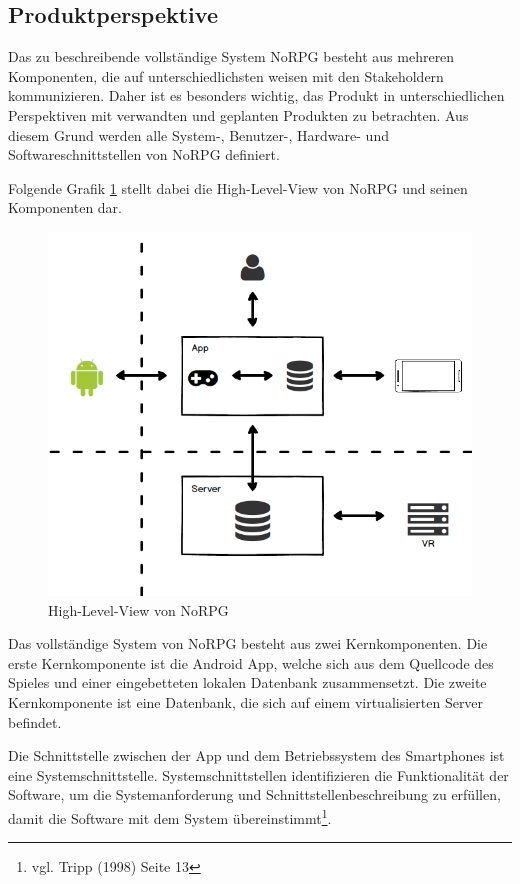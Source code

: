 	\subsection{Produktperspektive}
		Das zu beschreibende vollständige System NoRPG besteht aus mehreren Komponenten, die auf unterschiedlichsten weisen mit den Stakeholdern kommunizieren. Daher ist es besonders wichtig, das Produkt in unterschiedlichen Perspektiven mit verwandten und geplanten Produkten zu betrachten. Aus diesem Grund werden alle System-, Benutzer-, Hardware- und Softwareschnittstellen von NoRPG definiert. 
		
		Folgende Grafik \ref{highlevelview} stellt dabei die High-Level-View von NoRPG und seinen Komponenten dar.

		\begin{figure}[htbp]
			\centering 
			\label{highlevelview}
			\includegraphics[width=12cm]{pics/HighLevelView.png}
			\caption{High-Level-View von NoRPG}
		\end{figure}
		
		Das vollständige System von NoRPG besteht aus zwei Kernkomponenten. Die erste Kernkomponente ist die Android App, welche sich aus dem Quellcode des Spieles und einer eingebetteten lokalen Datenbank zusammensetzt. Die zweite Kernkomponente ist eine Datenbank, die sich auf einem virtualisierten Server befindet.
		
		Die Schnittstelle zwischen der App und dem Betriebssystem des Smartphones ist eine Systemschnittstelle. Systemschnittstellen identifizieren die Funktionalität der Software, um die Systemanforderung und Schnittstellenbeschreibung zu erfüllen, damit die Software mit dem System übereinstimmt\footnote{vgl. Tripp \cite{srsIEEE}(1998) Seite 13}.
		
